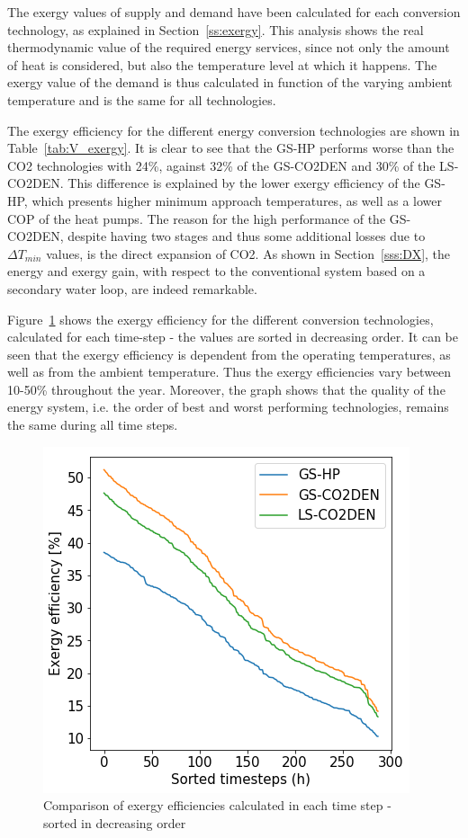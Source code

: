 \documentclass{article}
\begin{document}


The exergy values of supply and demand have been calculated for each conversion technology, as explained in Section~\ref{ss:exergy}. This analysis shows the real thermodynamic value of the required energy services, since not only the amount of heat is considered, but also the temperature level at which it happens. The exergy value of the demand is thus calculated in function of the varying ambient temperature and is the same for all technologies.

The exergy efficiency for the different energy conversion technologies are shown in Table~\ref{tab:V_exergy}. It is clear to see that the GS-HP performs worse than the CO2 technologies with 24\%, against 32\% of the GS-CO2DEN and 30\% of the LS-CO2DEN. This difference is explained by the lower exergy efficiency of the GS-HP, which presents higher minimum approach temperatures, as well as a lower COP of the heat pumps. The reason for the high performance of the GS-CO2DEN, despite having two stages and thus some additional losses due to $\Delta T_{min}$ values, is the direct expansion of CO2. As shown in Section~\ref{sss:DX}, the energy and exergy gain, with respect to the conventional system based on a secondary water loop, are indeed remarkable.



Figure~\ref{fig:v_exe} shows the exergy efficiency for the different conversion technologies, calculated for each time-step - the values are sorted in decreasing order. It can be seen that the exergy efficiency is dependent from the operating temperatures, as well as from the ambient temperature. Thus the exergy efficiencies vary between 10-50\% throughout the year. Moreover, the graph shows that the quality of the energy system, i.e. the order of best and worst performing technologies, remains the same during all time steps.

\begin{figure}[tph]
	\centering
	\includegraphics[width=0.5\linewidth]{exe}
	\caption{Comparison of exergy efficiencies calculated in each time step - sorted in decreasing order}
	\label{fig:v_exe}
\end{figure}
\end{document}
